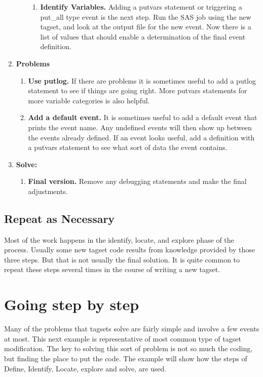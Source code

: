 \begin{enumerate}
\begin{enumerate}
\begin{enumerate}
\item {\bfseries Identify Variables.}
Adding a putvars statement or triggering a put\_all type event
is the next step.  
Run the SAS job using the new tagset, and look at the output file for 
the new event.  Now there is a list of values that should enable a
determination of the final event definition.
\end{enumerate}
\end{enumerate}


\item {\bfseries Problems}
\begin{enumerate}
\item {\bfseries Use putlog.}
If there are problems it is sometimes useful to add a putlog statement to
see if things are going right.  More putvars statements for more variable
categories is also helpful.

\item {\bfseries Add a default event.}
It is sometimes useful to add a default event that prints the event name.
Any undefined events will then show up between the events already defined.
If an event looks useful, add a definition with a putvars statement to see
what sort of data the event contains. 
\end{enumerate}

\item {\bfseries Solve:}
\begin{enumerate}
\item {\bfseries Final version.}
Remove any debugging statements and make the final adjustments.
\end{enumerate}
\end{enumerate}

\subsection{Repeat as Necessary}
Most of the work happens in the identify, locate, and explore phase of
the process.  Usually some new tagset code results from knowledge provided
by those three steps.  But that is not usually the final solution.
It is quite common to repeat these steps several times
in the course of writing a new tagset.

\section{Going step by step}

Many of the problems that tagsets solve are fairly simple and involve a few
events at most.  
This next example is representative of most common type of tagset modification.
The key to solving this sort of problem is not so much the coding, but finding
the place to put the code. The example will show how the steps of 
Define, Identify, Locate, explore and solve, are used.

